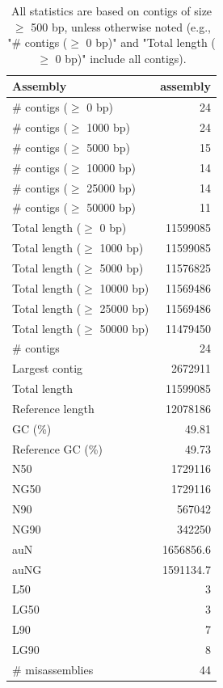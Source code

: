 \documentclass[12pt,a4paper]{article}
\begin{document}
\begin{table}[ht]
\begin{center}
\caption{All statistics are based on contigs of size $\geq$ 500 bp, unless otherwise noted (e.g., "\# contigs ($\geq$ 0 bp)" and "Total length ($\geq$ 0 bp)" include all contigs).}
\begin{tabular}{|l*{1}{|r}|}
\hline
Assembly & assembly \\ \hline
\# contigs ($\geq$ 0 bp) & 24 \\ \hline
\# contigs ($\geq$ 1000 bp) & 24 \\ \hline
\# contigs ($\geq$ 5000 bp) & 15 \\ \hline
\# contigs ($\geq$ 10000 bp) & 14 \\ \hline
\# contigs ($\geq$ 25000 bp) & 14 \\ \hline
\# contigs ($\geq$ 50000 bp) & 11 \\ \hline
Total length ($\geq$ 0 bp) & 11599085 \\ \hline
Total length ($\geq$ 1000 bp) & 11599085 \\ \hline
Total length ($\geq$ 5000 bp) & 11576825 \\ \hline
Total length ($\geq$ 10000 bp) & 11569486 \\ \hline
Total length ($\geq$ 25000 bp) & 11569486 \\ \hline
Total length ($\geq$ 50000 bp) & 11479450 \\ \hline
\# contigs & 24 \\ \hline
Largest contig & 2672911 \\ \hline
Total length & 11599085 \\ \hline
Reference length & 12078186 \\ \hline
GC (\%) & 49.81 \\ \hline
Reference GC (\%) & 49.73 \\ \hline
N50 & 1729116 \\ \hline
NG50 & 1729116 \\ \hline
N90 & 567042 \\ \hline
NG90 & 342250 \\ \hline
auN & 1656856.6 \\ \hline
auNG & 1591134.7 \\ \hline
L50 & 3 \\ \hline
LG50 & 3 \\ \hline
L90 & 7 \\ \hline
LG90 & 8 \\ \hline
\# misassemblies & 44 \\ \hline

\end{tabular}
\end{center}
\end{table}
\end{document}
